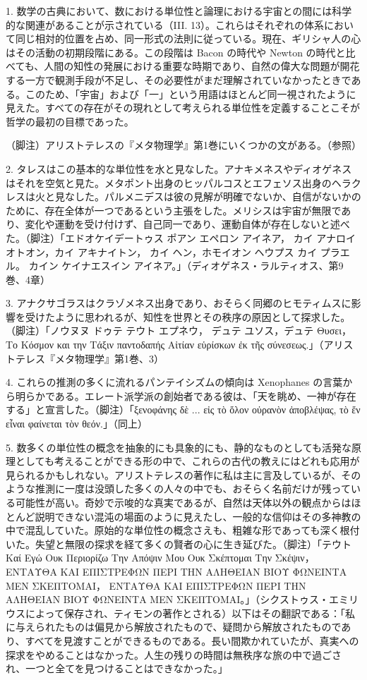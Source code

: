 \documentclass[a4paper,11pt,openany]{ltjsbook}
\begin{document}
1. 数学の古典において、数における単位性と論理における宇宙との間には科学的な関連があることが示されている（III. 13）。これらはそれぞれの体系において同じ相対的位置を占め、同一形式の法則に従っている。現在、ギリシャ人の心はその活動の初期段階にある。この段階は Bacon の時代や Newton の時代と比べても、人間の知性の発展における重要な時期であり、自然の偉大な問題が開花する一方で観測手段が不足し、その必要性がまだ理解されていなかったときである。このため、「宇宙」および「一」という用語はほとんど同一視されたように見えた。すべての存在がその現れとして考えられる単位性を定義することこそが哲学の最初の目標であった。

（脚注）アリストテレスの『メタ物理学』第1巻にいくつかの文がある。（参照）

2. タレスはこの基本的な単位性を水と見なした。アナキメネスやディオゲネスはそれを空気と見た。メタポント出身のヒッパルコスとエフェソス出身のヘラクレスは火と見なした。パルメニデスは彼の見解が明確でないか、自信がないかのために、存在全体が一つであるという主張をした。メリシスは宇宙が無限であり、変化や運動を受け付けず、自己同一であり、運動自体が存在しないと述べた。（脚注）「エドオケイデートゥス ポアン エペロン アイネア，
カイ アナロイオトオン，カイ アキナイトン，
カイ ヘン，ホモイオン ヘウプス カイ プラエル。
カイン ケイナエスイン アイネア。」（ディオゲネス・ラルティオス、第9巻、4章）

3. アナクサゴラスはクラゾメネス出身であり、おそらく同郷のヒモティムスに影響を受けたように思われるが、知性を世界とその秩序の原因として探求した。（脚注）「ノウヌヌ ドゥテ テウト エプネウ，
デュテ ユソス，デュテ Θυσει，
Το Κόσμον και την Τάξιν παντοδαπής
Αἰτίαν εὑρίσκων ἐκ τῆς σύνεσεως.」（アリストテレス『メタ物理学』第1巻、3）

4. これらの推測の多くに流れるパンテイシズムの傾向は Xenophanes の言葉から明らかである。エレート派学派の創始者である彼は、「天を眺め、一神が存在する」と宣言した。（脚注）「ξενοφάνης δὲ ... εἰς τὸ ὅλον οὐρανὸν ἀποβλέψας, τὸ ἕν εἶναι φαίνεται τὸν θεόν.」（同上）

5. 数多くの単位性の概念を抽象的にも具象的にも、静的なものとしても活発な原理としても考えることができる形の中で、これらの古代の教えにはどれも応用が見られるかもしれない。アリストテレスの著作に私は主に言及しているが、そのような推測に一度は没頭した多くの人々の中でも、おそらく名前だけが残っている可能性が高い。奇妙で示唆的な真実であるが、自然は天体以外の観点からはほとんど説明できない混沌の場面のように見えたし、一般的な信仰はその多神教の中で混乱していた。原始的な単位性の概念さえも、粗雑な形であっても深く根付いた。失望と無限の探求を経て多くの賢者の心に生き延びた。（脚注）「テウト Καί Εγώ Ουκ Περιορίζω Την Απόψιν Μου
Ουκ Σκέπτομαι Την Σκέψιν，
ΕΝΤΑΥΘΑ ΚΑΙ ΕΠΙΣΤΡΕΦΩΝ ΠΕΡΙ ΤΗΝ ΑΛΗΘΕΙΑΝ
ΒΙΟΥ ΦΩΝΕΙΝΤΑ ΜΕΝ ΣΚΕΠΤΟΜΑΙ，
ΕΝΤΑΥΘΑ ΚΑΙ ΕΠΙΣΤΡΕΦΩΝ ΠΕΡΙ ΤΗΝ ΑΛΗΘΕΙΑΝ
ΒΙΟΥ ΦΩΝΕΙΝΤΑ ΜΕΝ ΣΚΕΠΤΟΜΑΙ。」（シクストゥス・エミリウスによって保存され、ティモンの著作とされる）以下はその翻訳である：「私に与えられたものは偏見から解放されたもので、疑問から解放されたものであり、すべてを見渡すことができるものである。長い間欺かれていたが、真実への探求をやめることはなかった。人生の残りの時間は無秩序な旅の中で過ごされ、一つと全てを見つけることはできなかった。」
\end{document}
